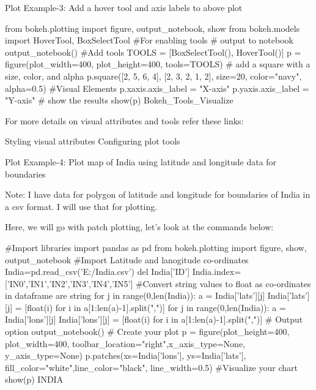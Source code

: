 
Plot Example-3: Add a hover tool and axis labels to above plot

from bokeh.plotting import figure, output_notebook, show
from bokeh.models import HoverTool, BoxSelectTool #For enabling tools
# output to notebook
output_notebook()
#Add tools
TOOLS = [BoxSelectTool(), HoverTool()]
p = figure(plot_width=400, plot_height=400, tools=TOOLS)
# add a square with a size, color, and alpha
p.square([2, 5, 6, 4], [2, 3, 2, 1, 2], size=20, color="navy", alpha=0.5)
#Visual Elements
p.xaxis.axis_label = "X-axis"
p.yaxis.axis_label = "Y-axis"
# show the results
show(p)
Bokeh_Tools_Visualize

For more details on visual attributes and tools refer these links:

Styling visual attributes
Configuring plot tools
 

Plot Example-4: Plot map of India using latitude and longitude data for boundaries




Note: I have data for polygon of latitude and longitude for boundaries of India in a csv format. I will use that for plotting.

Here, we will go with patch plotting, let’s look at the commands below:

#Import libraries
import pandas as pd
from bokeh.plotting import figure, show, output_notebook
#Import Latitude and lanogitude co-ordinates
India=pd.read_csv('E:/India.csv')
del India['ID']
India.index=['IN0','IN1','IN2','IN3','IN4','IN5']
#Convert string values to float as co-ordinates in dataframe are string
for j in range(0,len(India)):
 a = India['lats'][j]
 India['lats'][j] = [float(i) for i in a[1:len(a)-1].split(",")]
for j in range(0,len(India)):
 a = India['lons'][j]
 India['lons'][j] = [float(i) for i in a[1:len(a)-1].split(",")]
# Output option
output_notebook()
# Create your plot
p = figure(plot_height=400, plot_width=400, toolbar_location="right",x_axis_type=None, y_axis_type=None)
p.patches(xs=India['lons'], ys=India['lats'], fill_color="white",line_color="black", line_width=0.5)
#Visualize your chart
show(p)
INDIA

